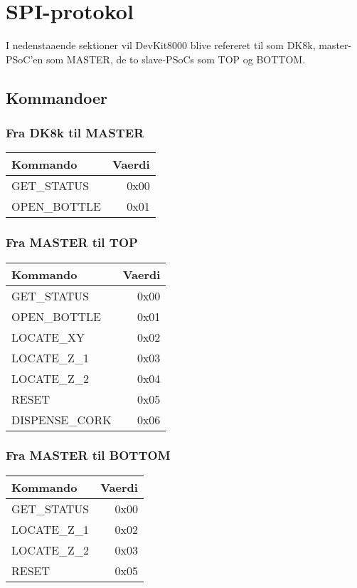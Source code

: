 \chapter{SPI-protokol}
\label{SPI-prot}

I nedenstaaende sektioner vil DevKit8000 blive refereret til som DK8k,
master-PSoC'en som MASTER, de to slave-PSoCs som TOP og BOTTOM.

\section{Kommandoer}
\subsection{Fra DK8k til MASTER}

\begin{table}[H]
\begin{tabular}{| l | r |}
\hline
Kommando & Vaerdi\\\hline
GET\_STATUS & 0x00\\\hline
OPEN\_BOTTLE & 0x01\\\hline
\end{tabular}
\end{table}

\subsection{Fra MASTER til TOP}

\begin{table}[H]
\begin{tabular}{| l | r |}
\hline
Kommando & Vaerdi\\\hline
GET\_STATUS & 0x00\\\hline
OPEN\_BOTTLE & 0x01\\\hline
LOCATE\_XY & 0x02\\\hline
LOCATE\_Z\_1 & 0x03\\\hline
LOCATE\_Z\_2 & 0x04\\\hline
RESET & 0x05\\\hline
DISPENSE\_CORK & 0x06\\\hline
\end{tabular}
\end{table}

\subsection{Fra MASTER til BOTTOM}

\begin{table}[H]
\begin{tabular}{| l | r |}
\hline
Kommando & Vaerdi\\\hline
GET\_STATUS & 0x00\\\hline
LOCATE\_Z\_1 & 0x02\\\hline
LOCATE\_Z\_2 & 0x03\\\hline
RESET & 0x05\\\hline
\end{tabular}
\end{table}

